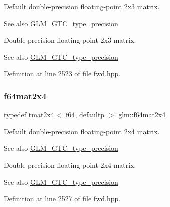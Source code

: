 Default double-\/precision floating-\/point 2x3 matrix. \begin{DoxySeeAlso}{See also}
\mbox{\hyperlink{group__gtc__type__precision}{G\+L\+M\+\_\+\+G\+T\+C\+\_\+type\+\_\+precision}}
\end{DoxySeeAlso}
Double-\/precision floating-\/point 2x3 matrix. \begin{DoxySeeAlso}{See also}
\mbox{\hyperlink{group__gtc__type__precision}{G\+L\+M\+\_\+\+G\+T\+C\+\_\+type\+\_\+precision}} 
\end{DoxySeeAlso}


Definition at line 2523 of file fwd.\+hpp.

\mbox{\label{group__gtc__type__precision_gaf18b9f693f2ef743d93c9afd5cfbe229}} 
\subsubsection{\texorpdfstring{f64mat2x4}{f64mat2x4}}
{\footnotesize\ttfamily typedef \mbox{\hyperlink{structglm_1_1tmat2x4}{tmat2x4}}$<$ \mbox{\hyperlink{group__gtc__type__precision_ga2bba392e555124b36cde6abba349bab3}{f64}}, \mbox{\hyperlink{namespaceglm_a0f04f086094c747d227af4425893f545a9d21ccd8b5a009ec7eb7677befc3bf51}{defaultp}} $>$ \mbox{\hyperlink{group__gtc__type__precision_gaf18b9f693f2ef743d93c9afd5cfbe229}{glm\+::f64mat2x4}}}

Default double-\/precision floating-\/point 2x4 matrix. \begin{DoxySeeAlso}{See also}
\mbox{\hyperlink{group__gtc__type__precision}{G\+L\+M\+\_\+\+G\+T\+C\+\_\+type\+\_\+precision}}
\end{DoxySeeAlso}
Double-\/precision floating-\/point 2x4 matrix. \begin{DoxySeeAlso}{See also}
\mbox{\hyperlink{group__gtc__type__precision}{G\+L\+M\+\_\+\+G\+T\+C\+\_\+type\+\_\+precision}} 
\end{DoxySeeAlso}


Definition at line 2527 of file fwd.\+hpp.

\mbox{\label{group__gtc__type__precision_ga44f23eb3c2e893d0afb1aa2b9e89be76}} 
